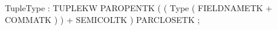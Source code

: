 %
%
%
\begin{rail}
TupleType : TUPLEKW PAROPENTK
            ( ( Type ( FIELDNAMETK + COMMATK ) ) + SEMICOLTK )
            PARCLOSETK
          ;
\end{rail}
